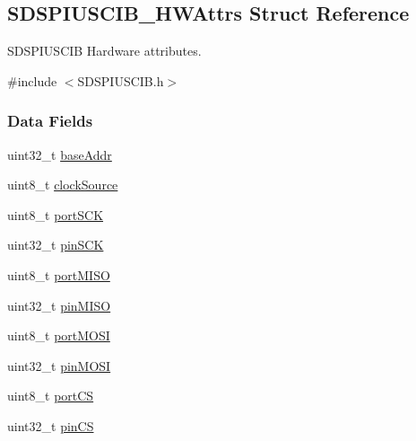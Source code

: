 \subsection{S\+D\+S\+P\+I\+U\+S\+C\+I\+B\+\_\+\+H\+W\+Attrs Struct Reference}
\label{struct_s_d_s_p_i_u_s_c_i_b___h_w_attrs}


S\+D\+S\+P\+I\+U\+S\+C\+I\+B Hardware attributes.  




{\ttfamily \#include $<$S\+D\+S\+P\+I\+U\+S\+C\+I\+B.\+h$>$}

\subsubsection*{Data Fields}
\begin{DoxyCompactItemize}
\item 
uint32\+\_\+t \hyperlink{struct_s_d_s_p_i_u_s_c_i_b___h_w_attrs_a79abe50fce2806f87a163d6f23a84bfc}{base\+Addr}
\item 
uint8\+\_\+t \hyperlink{struct_s_d_s_p_i_u_s_c_i_b___h_w_attrs_aa8f43f1ca5d5e37adcb870159bc53b51}{clock\+Source}
\item 
uint8\+\_\+t \hyperlink{struct_s_d_s_p_i_u_s_c_i_b___h_w_attrs_a9b770a9872ac79e5378787fa387abdb4}{port\+S\+C\+K}
\item 
uint32\+\_\+t \hyperlink{struct_s_d_s_p_i_u_s_c_i_b___h_w_attrs_a323d54fd5aa69f99cdc6a4b3feacaec4}{pin\+S\+C\+K}
\item 
uint8\+\_\+t \hyperlink{struct_s_d_s_p_i_u_s_c_i_b___h_w_attrs_a112c64aa057c1a0a33091ac5b79f0cdd}{port\+M\+I\+S\+O}
\item 
uint32\+\_\+t \hyperlink{struct_s_d_s_p_i_u_s_c_i_b___h_w_attrs_ade4c404a00f7c78c8e957f03c0f14c28}{pin\+M\+I\+S\+O}
\item 
uint8\+\_\+t \hyperlink{struct_s_d_s_p_i_u_s_c_i_b___h_w_attrs_ab78bc489ab2a35be42262b06d168ca94}{port\+M\+O\+S\+I}
\item 
uint32\+\_\+t \hyperlink{struct_s_d_s_p_i_u_s_c_i_b___h_w_attrs_ac494dc6eb480b4010f5dbfb086bb4800}{pin\+M\+O\+S\+I}
\item 
uint8\+\_\+t \hyperlink{struct_s_d_s_p_i_u_s_c_i_b___h_w_attrs_a0129b7fe4659c981ba8f10972587f845}{port\+C\+S}
\item 
uint32\+\_\+t \hyperlink{struct_s_d_s_p_i_u_s_c_i_b___h_w_attrs_a3afe9dbe3f17c8dbb9994eb936e57db1}{pin\+C\+S}
\end{DoxyCompactItemize}


